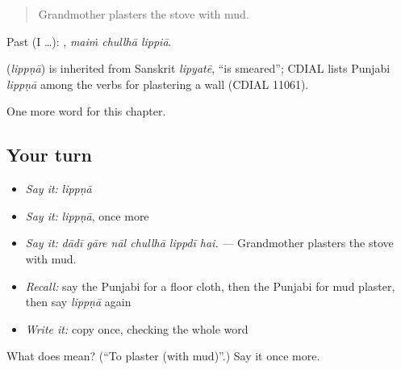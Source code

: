 \begin{quote}
Grandmother plasters the stove with mud.
\end{quote}

Past (I …):   , \emph{maiṁ chullhā lippiā}.

\begin{cousinweb}
\textbf{} (\emph{lippṇā}) is inherited from Sanskrit \emph{lipyatē}, \textquotedblleft{}is smeared\textquotedblright{}; CDIAL lists Punjabi \emph{lippṇā} among the verbs for plastering a wall (CDIAL 11061).
\end{cousinweb}

\begin{grammarlens}[title={What you've built}]
One more word for this chapter.
\end{grammarlens}

\subsection*{Your turn}
\begin{itemize}
\raggedright
  \item \emph{Say it:} \emph{lippṇā}
  \item \emph{Say it:} \emph{lippṇā}, once more
  \item \emph{Say it:} \emph{dādī gāre nāl chullhā lippdī hai.} — Grandmother plasters the stove with mud.
  \item \emph{Recall:} say the Punjabi for a floor cloth, then the Punjabi for mud plaster, then say \emph{lippṇā} again
  \item \emph{Write it:} copy \textbf{} once, checking the whole word
\end{itemize}

\begin{tcolorbox}[breakable,colback=teal!4,colframe=teal!35!black,title={Before you move on}]
What does  mean? (\textquotedblleft{}To plaster (with mud)\textquotedblright{}.) Say it once more.
\end{tcolorbox}
